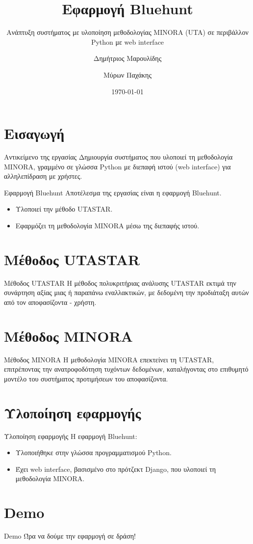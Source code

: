 \documentclass{beamer}
\title{Εφαρμογή Bluehunt}
\subtitle{Ανάπτυξη συστήματος με υλοποίηση μεθοδολογίας MINORA (UTA) σε περιβάλλον Python με web interface}
\author{Δημήτριος Μαρουλίδης \and Μύρων Παχάκης}
\institute{Πολυτεχνείο Κρήτης}
\date{\today}
\begin{document}
\begin{frame}[plain]
    \maketitle
\end{frame}

\section{Εισαγωγή}
\begin{frame}{Αντικείμενο της εργασίας}
    Δημιουργία συστήματος που υλοποιεί τη μεθοδολογία MINORA, γραμμένο σε γλώσσα Python με διεπαφή ιστού 
    (web interface) για αλληλεπίδραση με χρήστες.
\end{frame}
\begin{frame}{Εφαρμογή Bluehunt}
    Αποτέλεσμα της εργασίας είναι η εφαρμογή Bluehunt.
    
    \begin{itemize}
        \item Υλοποιεί την μέθοδο UTASTAR.
        \item Εφαρμόζει τη μεθοδολογία MINORA μέσω της διεπαφής ιστού.
    \end{itemize}
\end{frame}

\section{Μέθοδος UTASTAR}
\begin{frame}{Μέθοδος UTASTAR}
    Η μέθοδος πολυκριτήριας ανάλυσης UTASTAR εκτιμά την συνάρτηση αξίας μιας ή παραπάνω εναλλακτικών, με δεδομένη 
    την προδιάταξη αυτών από τον αποφασίζοντα - χρήστη.
\end{frame}

\section{Μέθοδος MINORA}
\begin{frame}{Μέθοδος MINORA}
    Η μεθοδολογία MINORA επεκτείνει τη UTASTAR, επιτρέποντας την ανατροφοδότηση τυχόντων δεδομένων,  καταλήγοντας στο επιθυμητό μοντέλο του συστήματος προτιμήσεων του αποφασίζοντα.
\end{frame}

\section{Υλοποίηση εφαρμογής}
\begin{frame}{Υλοποίηση εφαρμογής}
    Η εφαρμογή Bluehunt:
    \begin{itemize}
        \item Υλοποιήθηκε στην γλώσσα προγραμματισμού Python.
        \item Έχει web interface, βασισμένο στο πρότζεκτ Django, που υλοποιεί τη μεθοδολογία MINORA.
    \end{itemize}
    
\end{frame}

\section{Demo}
\begin{frame}{Demo}
    Ώρα να δούμε την εφαρμογή σε δράση!
\end{frame}
\end{document}
